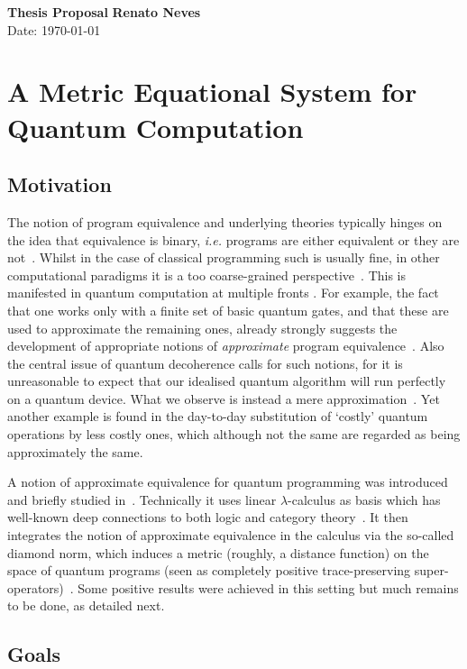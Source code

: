 \documentclass[a4paper, 11pt]{article}
\begin{document}
\noindent
\large\textbf{Thesis Proposal} \hfill \textbf{Renato Neves} \\
Date: \today

\section*{A Metric Equational System for Quantum Computation}

\subsection*{Motivation}

The notion of program equivalence and underlying theories typically hinges on
the idea that equivalence is binary, \emph{i.e.} programs are either equivalent
or they are not~\cite{winskel93}. Whilst in the case of classical programming
such is usually fine, in other computational paradigms it is a too
coarse-grained perspective~\cite{dahlqvist23b}. This is manifested in quantum
computation at multiple fronts \cite{han19,dahlqvist23b,watrous18}. For
example, the fact that one works only with a finite set of basic quantum gates,
and that these are used to approximate the remaining ones, already strongly
suggests the development of appropriate notions of \emph{approximate} program
equivalence~\cite{dahlqvist23b}. Also the central issue of
quantum decoherence calls for such notions, for it is unreasonable to expect
that our idealised quantum algorithm will run perfectly on a quantum device.
What we observe is instead a mere approximation~\cite{han19,preskill18}.  Yet
another example is found in the day-to-day substitution of `costly' quantum
operations by less costly ones, which although not the same are regarded as
being approximately the same.

A notion of approximate equivalence for quantum programming was introduced and
briefly studied in~\cite{dahlqvist23b}. Technically it uses linear
$\lambda$-calculus as basis which has well-known deep connections to both logic
and category theory~\cite{girard95,benton94}. It then integrates the notion of
approximate equivalence in the calculus via the so-called diamond norm, which
induces a metric (roughly, a distance function) on the space of quantum
programs (seen as completely positive trace-preserving
super-operators)~\cite{watrous18}. Some positive results were achieved in this
setting but much remains to be done, as detailed next.

\subsection*{Goals}
\end{document}
